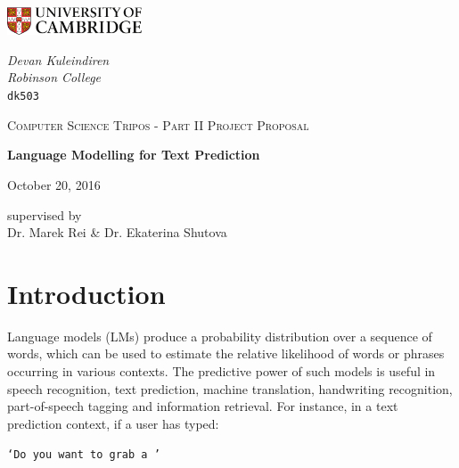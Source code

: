 \documentclass[a4paper, 12pt]{article}
\newcommand{\ttt}[1]{\texttt{#1}}
\begin{document}
\begin{titlepage}
	\noindent
	\begin{minipage}[t][][t]{0.5\textwidth}
		\includegraphics[width=40mm]{./Images/CamLogo.jpg}
	\end{minipage}
	\begin{minipage}{0.5\textwidth}
	\begin{flushright}
		\large
		\textit{Devan Kuleindiren}
		\\
		\textit{Robinson College}
		\\
		\texttt{dk503}
	\end{flushright}
	\end{minipage}
	
	\begin{center}
	\vspace{6cm}
	{\scshape\large Computer Science Tripos - Part II Project Proposal\par}
	\vspace{0.5cm}
	{\huge\bfseries Language Modelling for Text Prediction\par}
	\vspace{0.5cm}
	{\large October 20, 2016 \par}
	\end{center}
	
	\vfill
	
	\begin{center}
	supervised by \\
	Dr. Marek Rei \& Dr. Ekaterina Shutova
	\end{center}
	
	\vspace{1.5cm}
\end{titlepage}

\section*{Introduction}
Language models (LMs) produce a probability distribution over a sequence of words, which can be used to estimate the relative likelihood of words or phrases occurring in various contexts. The predictive power of such models is useful in speech recognition, text prediction, machine translation, handwriting recognition, part-of-speech tagging and information retrieval. For instance, in a text prediction context, if a user has typed:

\begin{center}
	\ttt{`Do you want to grab a '}
\end{center}
\end{document}
